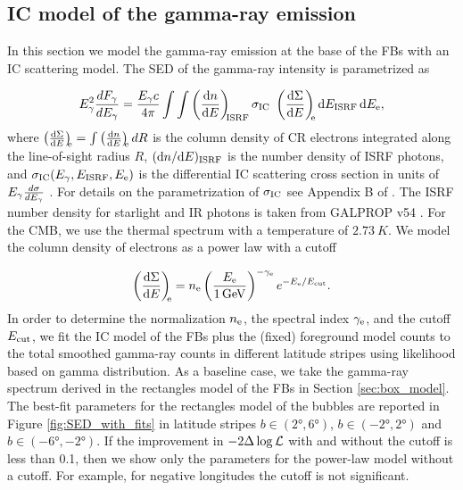 \subsection{IC model of the gamma-ray emission}
\label{sec:IC_model}

In this section we model the gamma-ray emission at the base of the FBs with an IC scattering model.
The SED of the gamma-ray intensity is parametrized as

\begin{equation}
E^2_\gamma \frac{dF_\gamma}{dE_\gamma} = 
\frac{E_\gamma c}{4\pi}\int \int \left(\frac{\text{d} n}{\text{d} E}\right)_{\!\!\text{ISRF}} \sigma_{\text{IC}}\ \left(\frac{\text{d} \Sigma}{\text{d} E}\right)_{\!\!\text{e}} \text{d} E_{\text{ISRF}}\, \text{d} E_{\text{e}},
\end{equation}
where $\left(\frac{\text{d} \Sigma}{\text{d} E}\right)_{\!\!\text{e}} = \int \left(\frac{\text{d} n}{\text{d} E}\right)_{\!\!\text{e}} dR$ is the column density 
of CR electrons integrated along the line-of-sight radius $R$,
$(\text{d} n/ \text{d} E)_{\text{ISRF}}$ is the number density of ISRF photons,
and $\sigma_{\text{IC}}(E_\gamma, E_{\text{ISRF}}, E_{\text{e}})$
is the differential IC scattering cross section in units of $E_\gamma\frac{d\sigma}{d E_\gamma}$ \citep{1970RvMP...42..237B}.
For details on the parametrization of $\sigma_{\text{IC}}$ see Appendix B of \cite{2014ApJ...793...64A}.
The ISRF number density for starlight and IR photons is taken from GALPROP v54 \citep{2006ApJ...640L.155M}.
For the CMB, we use the thermal spectrum with a temperature of $\SI{2.73}{K}$.
We model the column density of electrons as a power law with a cutoff

\begin{equation} 
\label{eq:e_spectrum}
\left(\frac{\text{d} \Sigma}{\text{d} E}\right)_{\!\!\text{e}} = n_{\text{e}} \left(\frac{E_{\text{e}}}{\SI{1}{GeV}}\right)^{-\gamma_{\text{e}}} e^{- E_{\text{e}} / E_{\text{cut}}}.
\end{equation}
In order to determine the normalization $n_{\text{e}}$, the spectral index $\gamma_{\text{e}}$, and the cutoff  $E_{\text{cut}}$, 
we fit the IC model of the FBs plus the (fixed) foreground model counts to the 
total smoothed gamma-ray counts in different latitude stripes using likelihood based on gamma distribution.
As a baseline case, we take the gamma-ray spectrum derived in the rectangles model of the FBs in Section \ref{sec:box_model}.
The best-fit parameters for the rectangles model of the bubbles are reported in Figure \ref{fig:SED_with_fits}
in latitude stripes $b \in (\ang{2}, \ang{6})$, $b \in (-\ang{2}, \ang{2})$ and $b \in (-\ang{6}, -\ang{2})$. 
If the improvement in $-2 \Delta \log {\mathcal{L}}$ with and without the cutoff is less than 0.1, then we show only the parameters for the power-law model without a cutoff.
For example, for negative longitudes the cutoff is not significant.


